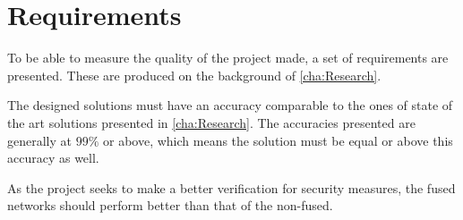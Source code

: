 \chapter{Requirements}\label{ch:req_spec_krag}
To be able to measure the quality of the project made, a set of requirements are presented. These are produced on the background of \autoref{cha:Research}.

The designed solutions must have an accuracy comparable to the ones of state of the art solutions presented in \autoref{cha:Research}. The accuracies presented are generally at $99\%$ or above, which means the solution must be equal or above this accuracy as well.

As the project seeks to make a better verification for security measures, the fused networks should perform better than that of the non-fused.

